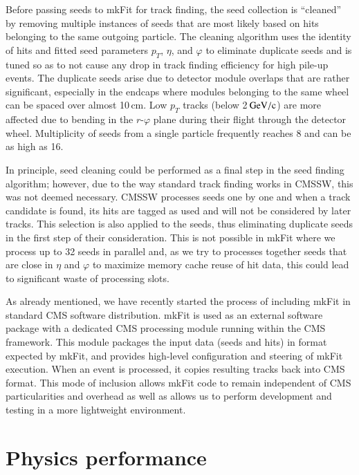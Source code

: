 \documentclass{webofc}
\def\mkfit{mkFit\xspace}
\def\GeVoc{\ensuremath{\,\rm{G}e\rm{V}/c}}
\begin{document}
Before passing seeds to \mkfit for track finding, the seed collection is
``cleaned'' by removing multiple instances of seeds that are most likely 
based on hits belonging to the same outgoing particle. The cleaning
algorithm uses the identity of hits and fitted seed parameters $p_T$, $\eta$,
and $\varphi$ to eliminate duplicate seeds and is tuned so as to not cause any
drop in track finding efficiency for high pile-up events. The duplicate seeds
arise due to detector module overlaps that are rather significant, especially
in the endcaps where modules belonging to the same wheel can be spaced over
almost 10\,cm. Low $p_T$ tracks (below 2\GeVoc) are more affected due to
bending in the $r$-$\varphi$ plane during their flight through the detector
wheel. Multiplicity of seeds from a single particle frequently reaches 8 and
can be as high as 16.

In principle, seed cleaning could be performed as a final step in the seed
finding algorithm; however, due to the way standard track finding works in
CMSSW, this was not deemed necessary. CMSSW processes seeds one by one and
when a track candidate is found, its hits are tagged as used and will not be
considered by later tracks. This selection is also applied to the seeds, thus
eliminating duplicate seeds in the first step of their consideration. This is
not possible in \mkfit where we process up to 32 seeds in parallel and, as we
try to processes together seeds that are close in $\eta$ and $\varphi$ to
maximize memory cache reuse of hit data, this could lead to significant waste
of processing slots.

As already mentioned, we have recently started the process of including \mkfit
in standard CMS software distribution. \mkfit is used as an external software
package with a dedicated CMS processing module running within the CMS
framework. This module packages the input data (seeds and hits) in format
expected by \mkfit, and provides high-level configuration and steering of
\mkfit execution. When an event is processed, it copies resulting tracks back
into CMS format. This mode of inclusion allows \mkfit code to remain
independent of CMS particularities and overhead as well as allows us to
perform development and testing in a more lightweight environment.


\section{Physics performance}
\label{sec:phys-perf}
\end{document}
